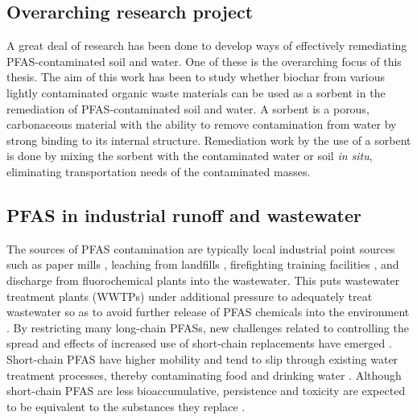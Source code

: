 \subsection{Overarching research project}
A great deal of research has been done to develop ways of effectively remediating PFAS-contaminated soil and water. One of these is the overarching focus of this thesis. The aim of this work has been to study whether biochar from various lightly contaminated organic waste materials can be used as a sorbent in the remediation of PFAS-contaminated soil and water. A sorbent is a porous, carbonaceous material with the ability to remove contamination from water by strong binding to its internal structure. Remediation work by the use of a sorbent is done by mixing the sorbent with the contaminated water or soil \textit{in situ}, eliminating transportation needs of the contaminated masses.  

\subsection{PFAS in industrial runoff and wastewater}
The sources of PFAS contamination are typically local industrial point sources such as paper mills \citep{lee2020legacy,langberg2021paper}, leaching from landfills \citep{masoner2020landfill}, firefighting training facilities \citep{filipovic2015historical}, and discharge from fluorochemical plants \citep{gebbink2017presence} into the wastewater. This puts wastewater treatment plants (\acrshort{WWTPs}) under additional pressure  to adequately treat wastewater so as to avoid further release of PFAS chemicals into the environment  \citep{Morin2017flameWaste}. By restricting many long-chain PFASs, new challenges related to controlling the spread and effects of increased use of short-chain replacements have emerged \citep{knutsen2019leachate}. Short-chain PFAS have higher mobility and tend to slip through existing water treatment processes, thereby contaminating food and drinking water \citep{hale2020persistent,brendel2018short}. Although short-chain PFAS are less bioaccumulative, persistence and toxicity are expected to be equivalent to the substances they replace \citep{EC2020PFAS}. 

